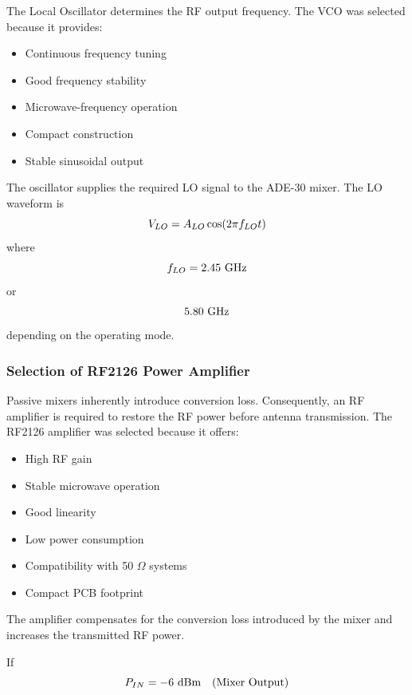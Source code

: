 \documentclass[12pt,a4paper]{report}
\begin{document}
	The Local Oscillator determines the RF output frequency. The VCO was selected because it provides:
	\begin{itemize}
		\item Continuous frequency tuning
		\item Good frequency stability
		\item Microwave-frequency operation
		\item Compact construction
		\item Stable sinusoidal output
	\end{itemize}
	The oscillator supplies the required LO signal to the ADE-30 mixer. The LO waveform is
	\begingroup
	\setlength{\mathindent}{0pt}
	\begin{equation*}
		\hfill
		V_{LO} = A_{LO} \cos(2\pi f_{LO} t)
		\hfill
	\end{equation*}
	\endgroup
	where
	\begingroup
	\setlength{\mathindent}{0pt}
	\begin{equation*}
		\hfill
		f_{LO} = 2.45\ \text{GHz}
		\hfill
	\end{equation*}
	\endgroup
	or
	\begingroup
	\setlength{\mathindent}{0pt}
	\begin{equation*}
		\hfill
		5.80\ \text{GHz}
		\hfill
	\end{equation*}
	\endgroup
	depending on the operating mode.
	
	\subsubsection{Selection of RF2126 Power Amplifier}
	
	Passive mixers inherently introduce conversion loss. Consequently, an RF amplifier is required to restore the RF power before antenna transmission. The RF2126 amplifier was selected because it offers:
	\begin{itemize}
		\item High RF gain
		\item Stable microwave operation
		\item Good linearity
		\item Low power consumption
		\item Compatibility with 50 $\Omega$ systems
		\item Compact PCB footprint
	\end{itemize}
	The amplifier compensates for the conversion loss introduced by the mixer and increases the transmitted RF power.
	
	If
	\begingroup
	\setlength{\mathindent}{0pt}
	\begin{equation*}
		\hfill
		P_{IN} = -6\ \text{dBm} \quad \text{(Mixer Output)}
		\hfill
	\end{equation*}
	\endgroup
	
\end{document}
